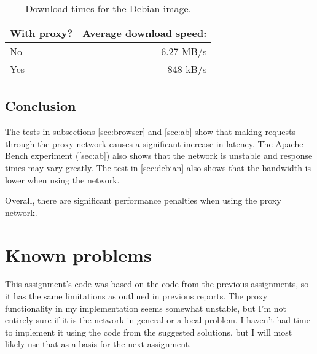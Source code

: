\documentclass{sig-alternate}
\begin{document}
\begin{table}[h]
\centering
\begin{tabular}{|l||r|}
\hline
\bf{With proxy?} & \bf{Average download speed:} \\
\hline\hline
No & 6.27 MB/s \\ \hline
Yes & 848 kB/s \\
\hline
\end{tabular}
\caption{Download times for the Debian image.}
\label{tbl:debian}
\end{table}


\subsection{Conclusion}
\label{sec:expconclusion}

The tests in subsections \ref{sec:browser} and \ref{sec:ab} show that making
requests through the proxy network causes a significant increase in latency.
The Apache Bench experiment (\autoref{sec:ab}) also shows that the network is
unstable and response times may vary greatly. The test in \autoref{sec:debian}
also shows that the bandwidth is lower when using the network.

Overall, there are significant performance penalties when using the proxy
network.


\section{Known problems}

This assignment's code was based on the code from the previous assignments,
so it has the same limitations as outlined in previous reports. The proxy
functionality in my implementation seems somewhat unstable, but I'm not
entirely sure if it is the network in general or a local problem. I haven't
had time to implement it using the code from the suggested solutions, but I
will most likely use that as a basis for the next assignment.


%

\end{document}
